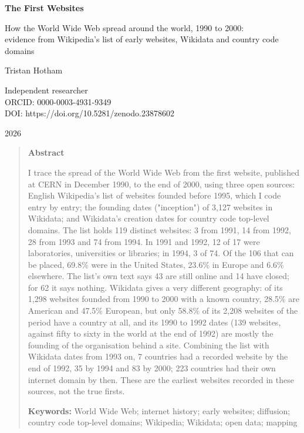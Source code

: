 \documentclass[11pt,a4paper]{article}
\begin{document}
\begin{center}
{\Large\bfseries The First Websites\par}
\vspace{0.4em}
{\large How the World Wide Web spread around the world, 1990 to 2000:\\evidence from Wikipedia's list of early websites, Wikidata and country code domains\par}
\vspace{1.2em}
{\large Tristan Hotham\par}
\vspace{0.3em}
{\small Independent researcher\\
ORCID: 0000-0003-4931-9349\\
DOI: https://doi.org/10.5281/zenodo.23878602\par}
\vspace{0.8em}
2026
\end{center}

\begin{quote}
\small
\begin{center}\textbf{Abstract}\end{center}
I trace the spread of the World Wide Web from the first website, published at CERN in December 1990, to the end of 2000, using three open sources: English Wikipedia's list of websites founded before 1995, which I code entry by entry; the founding dates ("inception") of 3,127 websites in Wikidata; and Wikidata's creation dates for country code top-level domains. The list holds 119 distinct websites: 3 from 1991, 14 from 1992, 28 from 1993 and 74 from 1994. In 1991 and 1992, 12 of 17 were laboratories, universities or libraries; in 1994, 3 of 74. Of the 106 that can be placed, 69.8\% were in the United States, 23.6\% in Europe and 6.6\% elsewhere. The list's own text says 43 are still online and 14 have closed; for 62 it says nothing. Wikidata gives a very different geography: of its 1,298 websites founded from 1990 to 2000 with a known country, 28.5\% are American and 47.5\% European, but only 58.8\% of its 2,208 websites of the period have a country at all, and its 1990 to 1992 dates (139 websites, against fifty to sixty in the world at the end of 1992) are mostly the founding of the organisation behind a site. Combining the list with Wikidata dates from 1993 on, 7 countries had a recorded website by the end of 1992, 35 by 1994 and 83 by 2000; 223 countries had their own internet domain by then. These are the earliest websites recorded in these sources, not the true firsts.

\textbf{Keywords:} World Wide Web; internet history; early websites; diffusion; country code top-level domains; Wikipedia; Wikidata; open data; mapping
\end{quote}
\end{document}
